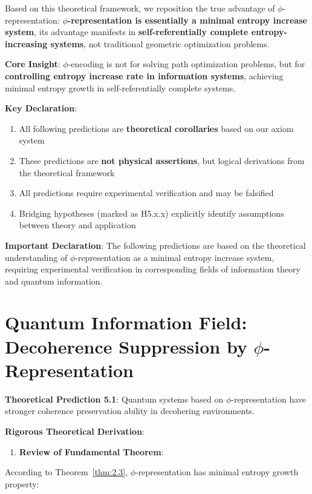 
Based on this theoretical framework, we reposition the true advantage of $\phi$-representation: \textbf{$\phi$-representation is essentially a minimal entropy increase system}, its advantage manifests in \textbf{self-referentially complete entropy-increasing systems}, not traditional geometric optimization problems.

\textbf{Core Insight}: $\phi$-encoding is not for solving path optimization problems, but for \textbf{controlling entropy increase rate in information systems}, achieving minimal entropy growth in self-referentially complete systems.

\textbf{Key Declaration}:
\begin{enumerate}
\item All following predictions are \textbf{theoretical corollaries} based on our axiom system
\item These predictions are \textbf{not physical assertions}, but logical derivations from the theoretical framework
\item All predictions require experimental verification and may be falsified
\item Bridging hypotheses (marked as H5.x.x) explicitly identify assumptions between theory and application
\end{enumerate}

\textbf{Important Declaration}: The following predictions are based on the theoretical understanding of $\phi$-representation as a minimal entropy increase system, requiring experimental verification in corresponding fields of information theory and quantum information.

\section{Quantum Information Field: Decoherence Suppression by $\phi$-Representation}
\label{sec:ch05_applications:quantum-information-field-decoherence-suppression-by-phi-representation}

\textbf{Theoretical Prediction 5.1}: Quantum systems based on $\phi$-representation have stronger coherence preservation ability in decohering environments.

\textbf{Rigorous Theoretical Derivation}:

\begin{enumerate}
\item \textbf{Review of Fundamental Theorem}:
\end{enumerate}
   According to Theorem~\ref{thm:2.3}, $\phi$-representation has minimal entropy growth property:
   
